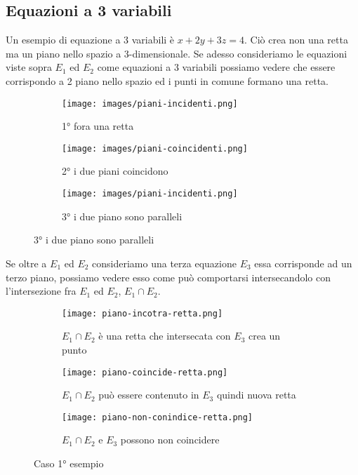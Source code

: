 \subsection{Equazioni a 3 variabili}
Un esempio di equazione a 3 variabili è $x + 2y + 3z = 4$. Ciò crea non una retta ma un piano nello spazio a 3-dimensionale.
Se adesso consideriamo le equazioni viste sopra $E_1$ ed $E_2$ come equazioni a 3 variabili possiamo vedere che essere corrispondo a 2 piano nello spazio ed i punti in comune formano una retta.
\begin{figure}[h!]
    \centering
    \begin{subfigure}{.3\textwidth}
        \centering
        \texttt{[image: images/piani-incidenti.png]}
        \caption{1° fora una retta}
    \end{subfigure}
    \begin{subfigure}{.3\textwidth}
        \centering
        \texttt{[image: images/piani-coincidenti.png]}
        \caption{2° i due piani coincidono}
    \end{subfigure}
    \begin{subfigure}{.3\textwidth}
        \centering
        \texttt{[image: images/piani-incidenti.png]}
        \caption{3° i due piano sono paralleli}
    \end{subfigure}
\end{figure}
Se oltre a $E_1$ ed $E_2$ consideriamo una terza equazione $E_3$ essa corrisponde ad un terzo piano, possiamo vedere esso come può comportarsi intersecandolo con l'intersezione fra $E_1$ ed $E_2$, $E_1 \cap E_2$.
\begin{figure}[h!]
    \centering
    \begin{subfigure}{.3\textwidth}
        \centering
        \texttt{[image: piano-incotra-retta.png]}
        \caption{$E_1 \cap E_2$ è una retta che intersecata con $E_3$ crea un punto}
    \end{subfigure}
    \begin{subfigure}{.3\textwidth}
        \centering
        \texttt{[image: piano-coincide-retta.png]}
        \caption{$E_1 \cap E_2$ può essere contenuto in $E_3$ quindi nuova retta}
    \end{subfigure}
    \begin{subfigure}{.3\textwidth}
        \centering
        \texttt{[image: piano-non-conindice-retta.png]}
        \caption{$E_1 \cap E_2$ e $E_3$ possono non coincidere}
    \end{subfigure}
    \caption{Caso 1° esempio}
\end{figure}

